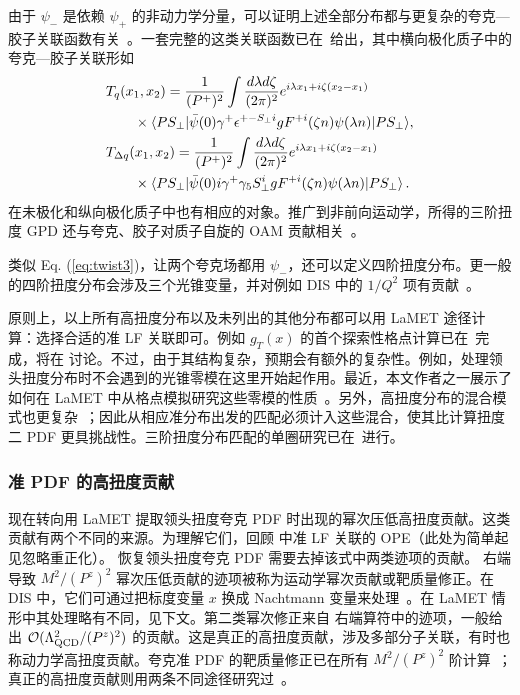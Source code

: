 由于 $\psi_-$ 是依赖 $\psi_+$ 的非动力学分量，可以证明上述全部分布都与更复杂的夸克—胶子关联函数有关~\cite{Ji:1990br,Balitsky:1996uh}。一套完整的这类关联函数已在~\cite{Qiu:1991pp,Ji:1992eu,Ji:2001bm,Kang:2008ey}给出，其中横向极化质子中的夸克—胶子关联形如
\begin{align}
	&T_q(x_1, x_2)=\frac{1}{(P^+)^2}\int\frac{d\lambda d\zeta}{(2\pi)^2}e^{i\lambda x_1+i\zeta(x_2-x_1)}\\
	&\hspace{2em}\times\langle PS_\perp|\bar\psi(0)\gamma^+ \epsilon^{+-S_\perp i}g F^{+i}(\zeta n)\psi(\lambda n)|PS_\perp\rangle,\nonumber\\
	&T_{\Delta q}(x_1, x_2)=\frac{1}{(P^+)^2}\int\frac{d\lambda d\zeta}{(2\pi)^2}e^{i\lambda x_1+i\zeta(x_2-x_1)}\\
	&\hspace{2em}\times\langle PS_\perp|\bar\psi(0)i\gamma^+\gamma_5 S^i_\perp g F^{+i}(\zeta n)\psi(\lambda n)|PS_\perp\rangle\,.\nonumber
\end{align}
在未极化和纵向极化质子中也有相应的对象。推广到非前向运动学，所得的三阶扭度 GPD 还与夸克、胶子对质子自旋的 OAM 贡献相关~\cite{Hatta:2012cs,Ji:2012ba}。

类似 Eq. (\ref{eq:twist3})，让两个夸克场都用 $\psi_-$，还可以定义四阶扭度分布。更一般的四阶扭度分布会涉及三个光锥变量，并对例如 DIS 中的 $1/Q^2$ 项有贡献~\cite{Jaffe:1982pm,Ellis:1982cd,Jaffe:1991ra,Ji:1993ey}。

原则上，以上所有高扭度分布以及未列出的其他分布都可以用 LaMET 途径计算：选择合适的准 LF 关联即可。例如 $g_T(x)$ 的首个探索性格点计算已在~\cite{Bhattacharya:2020cen}完成，将在  讨论。不过，由于其结构复杂，预期会有额外的复杂性。例如，处理领头扭度分布时不会遇到的光锥零模在这里开始起作用。最近，本文作者之一展示了如何在 LaMET 中从格点模拟研究这些零模的性质~\cite{Ji:2020baz}。另外，高扭度分布的混合模式也更复杂~\cite{Ji:1990br,Balitsky:1996uh}；因此从相应准分布出发的匹配必须计入这些混合，使其比计算扭度二 PDF 更具挑战性。三阶扭度分布匹配的单圈研究已在~\cite{Bhattacharya:2020xlt,Bhattacharya:2020jfj}进行。


\subsubsection{准 PDF 的高扭度贡献}

现在转向用 LaMET 提取领头扭度夸克 PDF 时出现的幂次压低高扭度贡献。这类贡献有两个不同的来源。为理解它们，回顾  中准 LF 关联的 OPE（此处为简单起见忽略重正化）。
%
恢复领头扭度夸克 PDF 需要去掉该式中两类迹项的贡献。 右端导致 $M^2/(P^z)^2$ 幂次压低贡献的迹项被称为运动学幂次贡献或靶质量修正。在 DIS 中，它们可通过把标度变量 $x$ 换成 Nachtmann 变量来处理~\cite{Nachtmann:1973mr}。在 LaMET 情形中其处理略有不同，见下文。第二类幂次修正来自  右端算符中的迹项，一般给出 $\mathcal O(\Lambda^2_{\rm{QCD}}/(P^z)^2)$ 的贡献。这是真正的高扭度贡献，涉及多部分子关联，有时也称动力学高扭度贡献。夸克准 PDF 的靶质量修正已在所有 $M^2/(P^z)^2$ 阶计算~\cite{Chen:2016utp,Radyushkin:2017ffo}；真正的高扭度贡献则用两条不同途径研究过~\cite{Chen:2016utp,Braun:2018brg}。


